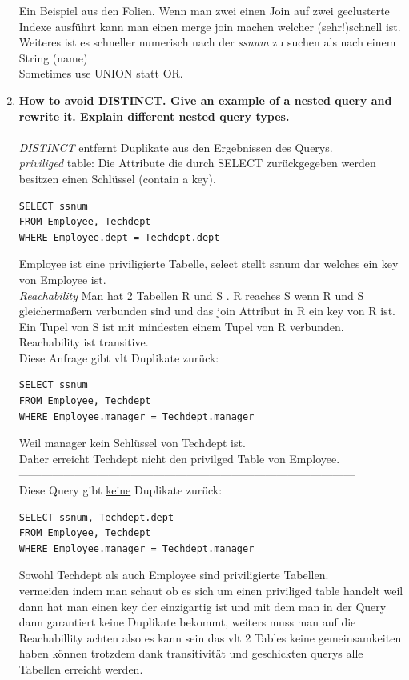 \documentclass[12pt]{article}\pagestyle{myheadings}
\theoremstyle{plain}
\begin{document}
\begin{enumerate}
Ein Beispiel aus den Folien.
Wenn man zwei einen Join auf zwei geclusterte Indexe ausführt kann man einen merge join machen welcher (sehr!)schnell ist.\\
Weiteres ist es schneller numerisch nach der \textit{ssnum} zu suchen als nach einem String (name)\\
Sometimes use UNION statt OR.


\item \textbf{How to avoid DISTINCT. Give an example of a nested query and rewrite it. Explain different nested query
types.
} \\ \\
\textit{DISTINCT} entfernt Duplikate aus den Ergebnissen des Querys.\\
\textit{priviliged} table: Die Attribute die durch SELECT zurückgegeben werden besitzen einen Schlüssel (contain a key).
\begin{verbatim}
SELECT ssnum
FROM Employee, Techdept
WHERE Employee.dept = Techdept.dept
\end{verbatim}
Employee ist eine priviligierte Tabelle, select stellt ssnum dar welches ein key von Employee ist.\\
\textit{Reachability} Man hat 2 Tabellen R und S .
R reaches S wenn R und S gleichermaßern verbunden sind und das join Attribut in R ein key von R ist.\\
Ein Tupel von S ist mit mindesten einem Tupel von R verbunden.\\
Reachability ist transitive.\\
Diese Anfrage gibt vlt Duplikate zurück:
\begin{verbatim}
SELECT ssnum
FROM Employee, Techdept
WHERE Employee.manager = Techdept.manager
\end{verbatim}
Weil manager kein Schlüssel von Techdept ist.\\
Daher erreicht Techdept nicht den privilged Table von Employee.\\------------------------------------------------------------------------------------------ \\
Diese Query gibt \underline{keine} Duplikate zurück:
\begin{verbatim}
SELECT ssnum, Techdept.dept
FROM Employee, Techdept
WHERE Employee.manager = Techdept.manager
\end{verbatim}
Sowohl Techdept als auch Employee sind priviligierte Tabellen.\\ vermeiden indem man schaut ob es sich um einen priviliged table handelt weil dann hat man einen key der einzigartig ist und mit dem man in der Query dann garantiert keine Duplikate bekommt, weiters muss man auf die Reachabillity achten also es kann sein das vlt 2 Tables keine gemeinsamkeiten haben können trotzdem dank transitivität und geschickten querys alle Tabellen erreicht werden.\\ \\

\end{enumerate}
\end{document}
